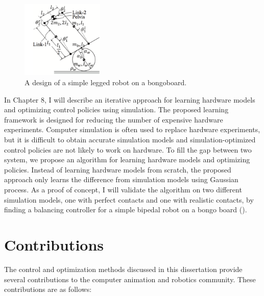 \begin{figure}
 \vspace{-10pt}
  \begin{center}
    \includegraphics[width=0.35\textwidth]{images/intro_simple_robot.png}
  \end{center}
   \vspace{-25pt}
  \caption{A design of a simple legged robot on a bongoboard.}
  \label{fig:intro_bongo}
   \vspace{-10pt}
\end{figure}
In Chapter 8, I will describe an iterative approach for learning 
hardware models and optimizing control policies using simulation.
The proposed learning framework is designed for reducing the number of
expensive hardware experiments. 
Computer simulation is often used to replace hardware experiments,
but it is difficult to obtain accurate simulation models and
simulation-optimized control policies are not likely to work on hardware.
To fill the gap between two system, we propose an algorithm for learning
hardware models and optimizing policies. 
Instead of learning hardware models from scratch, the proposed approach only
learns the difference from simulation models using Gaussian process.
As a proof of concept, I will validate the algorithm on two different 
simulation models, one with perfect contacts and one with realistic contacts,
by finding a balancing controller for a simple bipedal robot on a bongo board
().

\section{Contributions}
The control and optimization methods discussed in this dissertation provide
several contributions to the computer animation and robotics community. 
These contributions are as follows:

